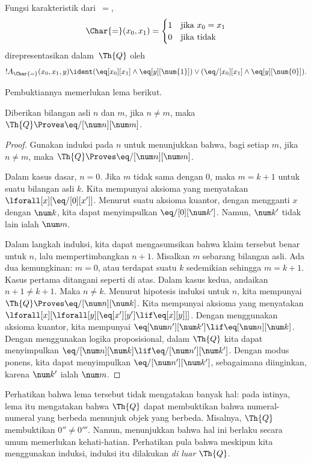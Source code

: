 \documentclass[../../../include/open-logic-section]{subfiles}
\begin{document}
\begin{prop}
Fungsi karakteristik dari~$=$,
\[
\Char{=}(x_0, x_1) =
\begin{cases}
  1 & \text{jika } x_0 =x_1\\
  0 & \text{jika tidak}
\end{cases}
\]
direpresentasikan dalam~$\Th{Q}$ oleh
\[
  !A_{\Char{=}}(x_0, x_1, y) \ident (\eq[x_0][x_1] \land
  \eq[y][\num{1}]) \lor (\eq/[x_0][x_1] \land \eq[y][\num{0}]).
\]
\end{prop}

Pembuktiannya memerlukan lema berikut.

\begin{lem}
 Diberikan bilangan asli $n$ dan $m$, jika
$n \neq m$, maka $\Th{Q} \Proves \eq/[\num n][\num m]$.
\end{lem}

\begin{proof}
Gunakan induksi pada $n$ untuk menunjukkan bahwa, bagi setiap $m$, jika
$n \neq m$, maka $\Th{Q} \Proves \eq/[\num n][\num m]$.

Dalam kasus dasar, $n = 0$. Jika $m$ tidak sama dengan $0$, maka
$m = k + 1$ untuk suatu bilangan asli $k$. Kita mempunyai aksioma yang
menyatakan $\lforall[x][\eq/[0][x']]$. Menurut suatu aksioma kuantor, dengan
mengganti $x$ dengan $\num k$, kita dapat menyimpulkan
$\eq/[0][\num k']$. Namun, $\num k'$ tidak lain ialah $\num m$.

Dalam langkah induksi, kita dapat mengasumsikan bahwa klaim tersebut benar
untuk $n$, lalu mempertimbangkan $n+1$. Misalkan $m$ sebarang bilangan asli.
Ada dua kemungkinan: $m = 0$, atau terdapat suatu $k$ sedemikian sehingga
$m = k+1$. Kasus pertama ditangani seperti di atas. Dalam kasus kedua,
andaikan $n+1 \neq k+1$. Maka $n \neq k$. Menurut hipotesis induksi untuk
$n$, kita mempunyai $\Th{Q} \Proves \eq/[\num n][\num k]$. Kita mempunyai
aksioma yang menyatakan
$\lforall[x][\lforall[y][\eq[x'][y'] \lif \eq[x][y]]]$. Dengan menggunakan
aksioma kuantor, kita mempunyai
$\eq[\num n'][\num k'] \lif \eq[\num n][\num k]$. Dengan menggunakan
logika proposisional, dalam $\Th{Q}$ kita dapat menyimpulkan
$\eq/[\num n][\num k] \lif \eq/[\num n'][\num k']$. Dengan modus ponens,
kita dapat menyimpulkan $\eq/[\num n'][\num k']$, sebagaimana diinginkan,
karena $\num k'$ ialah $\num m$.
\end{proof}

\begin{explain}
Perhatikan bahwa lema tersebut tidak mengatakan banyak hal: pada intinya,
lema itu mengatakan bahwa $\Th{Q}$ dapat membuktikan bahwa numeral-numeral
yang berbeda menunjuk objek yang berbeda. Misalnya, $\Th{Q}$ membuktikan
$0'' \neq 0'''$. Namun, menunjukkan bahwa hal ini berlaku secara umum
memerlukan kehati-hatian. Perhatikan pula bahwa meskipun kita menggunakan
induksi, induksi itu dilakukan \emph{di luar} $\Th{Q}$.
\end{explain}
\end{document}
